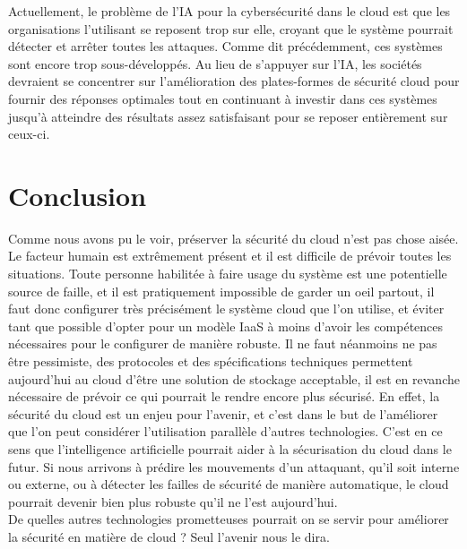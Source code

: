 \documentclass[a4paper, 12pt]{article}
\begin{document}
\begin{spacing}{1.1}
      Actuellement, le problème de l’IA pour la cybersécurité dans le cloud est
      que les organisations l’utilisant se reposent trop sur elle, croyant que
      le système pourrait détecter et arrêter toutes les attaques. Comme dit
      précédemment, ces systèmes sont encore trop sous-développés. Au lieu de
      s'appuyer sur l’IA, les sociétés devraient se concentrer sur
      l'amélioration des plates-formes de sécurité cloud pour fournir des
      réponses optimales tout en continuant à investir dans ces systèmes jusqu’à
      atteindre des résultats assez satisfaisant pour se reposer entièrement sur
      ceux-ci.

  \section{Conclusion}
    Comme nous avons pu le voir, préserver la sécurité du cloud n'est pas chose
    aisée. Le facteur humain est extrêmement présent et il est difficile de
    prévoir toutes les situations. Toute personne habilitée à faire usage du
    système est une potentielle source de faille, et il est pratiquement
    impossible de garder un oeil partout, il faut donc configurer très
    précisément le système cloud que l'on utilise, et éviter tant que possible
    d'opter pour un modèle IaaS à moins d'avoir les compétences nécessaires pour
    le configurer de manière robuste. Il ne faut néanmoins ne pas être
    pessimiste, des protocoles et des spécifications techniques permettent
    aujourd'hui au cloud d'être une solution de stockage acceptable, il est en
    revanche nécessaire de prévoir ce qui pourrait le rendre encore plus
    sécurisé. En effet, la sécurité du cloud est un enjeu pour l'avenir, et
    c'est dans le but de l'améliorer que l'on peut considérer l'utilisation
    parallèle d'autres technologies. C'est en ce sens que l'intelligence
    artificielle pourrait aider à la sécurisation du cloud dans le futur. Si
    nous arrivons à prédire les mouvements d'un attaquant, qu'il soit interne ou
    externe, ou à détecter les failles de sécurité de manière automatique, le
    cloud pourrait devenir bien plus robuste qu'il ne l'est aujourd'hui. \\

    De quelles autres technologies prometteuses pourrait on se servir pour
    améliorer la sécurité en matière de cloud ? Seul l'avenir nous le dira.


\end{spacing}
\end{document}
